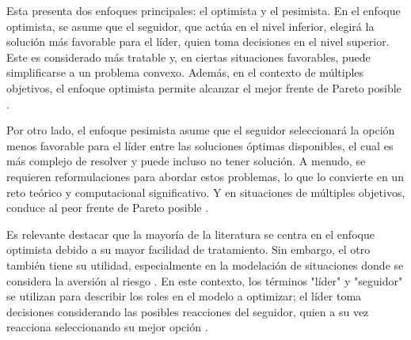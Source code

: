 Esta presenta dos enfoques principales: el optimista y el pesimista. En el enfoque optimista, se asume que el seguidor, que actúa en el nivel inferior, elegirá la solución más favorable para el líder, quien toma decisiones en el nivel superior. Este es considerado más tratable y, en ciertas situaciones favorables, puede simplificarse a un problema convexo. Además, en el contexto de múltiples objetivos, el enfoque optimista permite alcanzar el mejor frente de Pareto posible \cite{DempeyZemkoho2020}.

Por otro lado, el enfoque pesimista asume que el seguidor seleccionará la opción menos favorable para el líder entre las soluciones óptimas disponibles, el cual es más complejo de resolver y puede incluso no tener solución. A menudo, se requieren reformulaciones para abordar estos problemas, lo que lo convierte en un reto teórico y computacional significativo. Y en situaciones de múltiples objetivos, conduce al peor frente de Pareto posible \cite{Sinha2017ARO}.

Es relevante destacar que la mayoría de la literatura se centra en el enfoque optimista debido a su mayor facilidad de tratamiento. Sin embargo, el otro también tiene su utilidad, especialmente en la modelación de situaciones donde se considera la aversión al riesgo \cite{DempeyZemkoho2020}. En este contexto, los términos "líder" y "seguidor" se utilizan para describir los roles en el modelo a optimizar; el líder toma decisiones considerando las posibles reacciones del seguidor, quien a su vez reacciona seleccionando su mejor opción \cite{Sinha2017ARO}.


